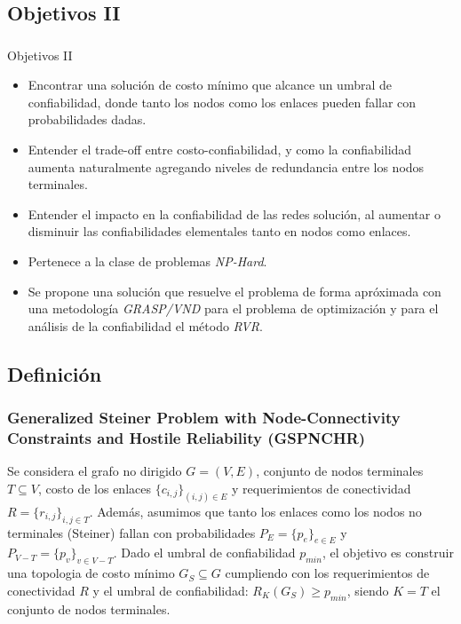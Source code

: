 \subsection{Objetivos II}
\begin{frame}
	\frametitle{}
    \begin{block}{Objetivos II}
	\begin{itemize} 
    	\item Encontrar una solución de costo mínimo que alcance un umbral de confiabilidad, donde tanto los nodos como los enlaces pueden fallar con probabilidades dadas.
		\item Entender el trade-off entre costo-confiabilidad, y como la confiabilidad aumenta naturalmente agregando niveles de redundancia entre los nodos terminales.
		\item Entender el impacto en la confiabilidad de las redes solución, al aumentar o disminuir las confiabilidades elementales tanto en nodos como enlaces. %
    	\item Pertenece a la clase de problemas \emph{NP-Hard}.
    	\item Se propone una solución que resuelve el problema de forma apróximada con una metodología \emph{GRASP/VND} para el problema de optimización y para el análisis de la confiabilidad el método \emph{RVR}.
	\end{itemize} 
    \end{block}
\end{frame}

\subsection{Definición}
\begin{frame}\frametitle{Generalized Steiner Problem with Node-Connectivity Constraints and
Hostile Reliability (GSPNCHR)}
    \begin{definition}[GSPNCHR]
Se considera el grafo no dirigido $G=(V,E)$, conjunto de nodos terminales $T \subseteq V$, costo de los enlaces $\{c_{i,j}\}_{(i,j) \in E}$ y requerimientos de conectividad $R=\{r_{i,j}\}_{i,j \in T}$. Además, asumimos que tanto los enlaces como los nodos no terminales (Steiner) fallan con probabilidades $P_E=\{p_e\}_{e\in E}$ y $P_{V-T}=\{p_v\}_{v\in V-T}$. 
Dado el umbral de confiabilidad $p_{min}$, el objetivo es construir una topologia de costo mínimo $G_S \subseteq G$ cumpliendo con los requerimientos de conectividad $R$ y el umbral de confiabilidad: $R_{K}(G_S) \geq p_{min}$, siendo $K=T$ el conjunto de nodos terminales.
\end{definition}
\end{frame}

